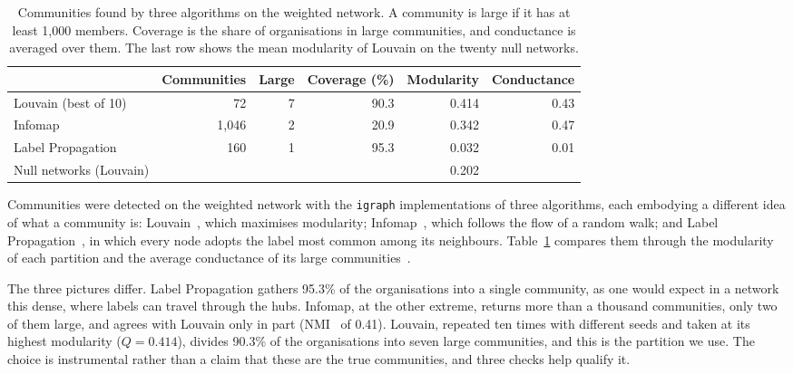 \documentclass[sigchi]{acmart}
\begin{document}
\begin{table}[t]
\caption{Communities found by three algorithms on the weighted network. A community is large if it has at least 1,000 members. Coverage is the share of organisations in large communities, and conductance is averaged over them. The last row shows the mean modularity of Louvain on the twenty null networks.}
\label{tab:communities}
\small
\setlength{\tabcolsep}{4pt}
\begin{adjustbox}{max width=\columnwidth}
\begin{tabular}{lrrrrr}
\toprule
 & Communities & Large & Coverage (\%) & Modularity & Conductance \\
\midrule
Louvain (best of 10) & 72 & 7 & 90.3 & 0.414 & 0.43 \\
Infomap & 1,046 & 2 & 20.9 & 0.342 & 0.47 \\
Label Propagation & 160 & 1 & 95.3 & 0.032 & 0.01 \\
\midrule
Null networks (Louvain) & & & & 0.202 & \\
\bottomrule
\end{tabular}
\end{adjustbox}
\end{table}

Communities were detected on the weighted network with the \texttt{igraph} implementations of three algorithms, each embodying a different idea of what a community is: Louvain~\cite{blondel2008}, which maximises modularity; Infomap~\cite{rosvall2008}, which follows the flow of a random walk; and Label Propagation~\cite{raghavan2007}, in which every node adopts the label most common among its neighbours. Table~\ref{tab:communities} compares them through the modularity of each partition and the average conductance of its large communities~\cite{yang2015}. 

The three pictures differ. Label Propagation gathers 95.3\% of the organisations into a single community, as one would expect in a network this dense, where labels can travel through the hubs. Infomap, at the other extreme, returns more than a thousand communities, only two of them large, and agrees with Louvain only in part (NMI~\cite{danon2005} of 0.41). Louvain, repeated ten times with different seeds and taken at its highest modularity ($Q = 0.414$), divides 90.3\% of the organisations into seven large communities, and this is the partition we use. The choice is instrumental rather than a claim that these are the true communities, and three checks help qualify it.
\end{document}
